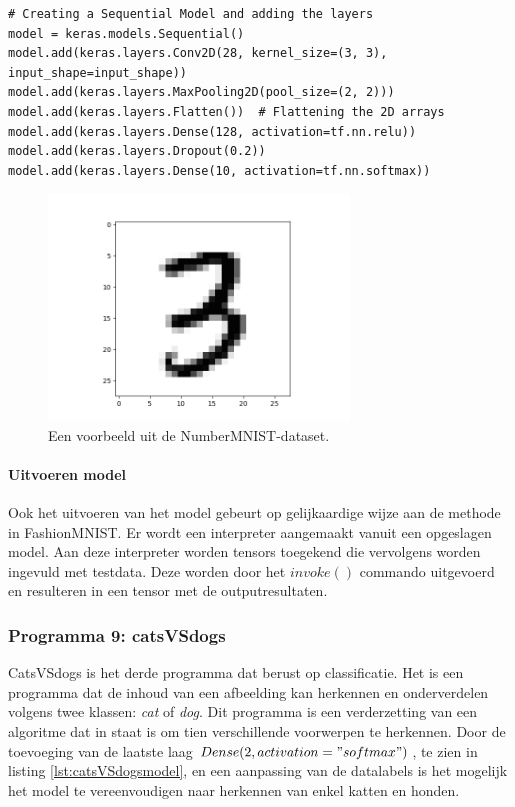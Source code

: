 	\begin{lstlisting}[caption={Structuur van het \gls{cnn} NumberMNIST.}, captionpos=b,label={lst:NumberMNISTmodel}]
# Creating a Sequential Model and adding the layers
model = keras.models.Sequential()
model.add(keras.layers.Conv2D(28, kernel_size=(3, 3), input_shape=input_shape))
model.add(keras.layers.MaxPooling2D(pool_size=(2, 2)))
model.add(keras.layers.Flatten())  # Flattening the 2D arrays
model.add(keras.layers.Dense(128, activation=tf.nn.relu))
model.add(keras.layers.Dropout(0.2))
model.add(keras.layers.Dense(10, activation=tf.nn.softmax))
\end{lstlisting}	

			\begin{figure}
				\centering
				\includegraphics[width=80mm]{afbeeldingen/NumberMNIST.PNG}
				\caption{Een voorbeeld uit de NumberMNIST-dataset.}
				\label{fig:NumberMNIST}
			\end{figure}


		
			\paragraph{Uitvoeren model}
			Ook het uitvoeren van het model gebeurt op gelijkaardige wijze aan de methode in FashionMNIST. Er wordt een interpreter aangemaakt vanuit een opgeslagen model. Aan deze interpreter worden tensors toegekend die vervolgens worden ingevuld met testdata. Deze worden door het $invoke()$ commando uitgevoerd en resulteren in een tensor met de outputresultaten.
			
		\subsubsection{Programma 9: catsVSdogs}
		CatsVSdogs is het derde programma dat berust op classificatie. Het is een programma dat de inhoud van een afbeelding kan herkennen en onderverdelen volgens twee klassen: \textit{cat} of \textit{dog}. Dit programma is een verderzetting van een algoritme dat in staat is om tien verschillende voorwerpen te herkennen. Door de toevoeging van de laatste laag $Dense(2, activation="softmax")$, te zien in listing \ref{lst:catsVSdogsmodel}, en een aanpassing van de datalabels is het mogelijk het model te vereenvoudigen naar herkennen van enkel katten en honden. \\
		
